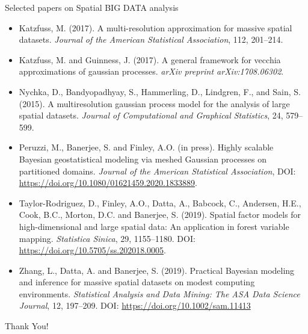 \documentclass[
10pt]{beamer}
\begin{document}
\begin{frame}{Selected papers on Spatial BIG DATA analysis}
{\begin{itemize}
\item Katzfuss, M. (2017). A multi-resolution approximation for massive spatial datasets. \emph{Journal of the American Statistical Association}, 112, 201--214.
 
\item Katzfuss, M. and Guinness, J. (2017). A general framework for vecchia approximations of gaussian processes. \emph{arXiv preprint arXiv:1708.06302}.

\item Nychka, D., Bandyopadhyay, S., Hammerling, D., Lindgren, F., and Sain, S. (2015). A multiresolution gaussian process model for the analysis of large spatial datasets. \emph{Journal of Computational and Graphical Statistics}, 24, 579--599. 
 

\item Peruzzi, M., Banerjee, S. and Finley, A.O. (in press). Highly scalable Bayesian geostatistical modeling via meshed Gaussian processes on partitioned domains. \emph{Journal of the American Statistical Association}, DOI: \url{https://doi.org/10.1080/01621459.2020.1833889}. 
 
\item Taylor-Rodriguez, D., Finley, A.O., Datta, A., Babcock, C., Andersen, H.E., Cook, B.C., Morton, D.C. and Banerjee, S. (2019).  Spatial factor models for high-dimensional and large spatial data: An application in forest variable mapping. \emph{Statistica Sinica}, {29}, 1155--1180. DOI: \url{https://doi.org/10.5705/ss.202018.0005}.
 
 \item Zhang, L., Datta, A. and Banerjee, S. (2019). Practical Bayesian modeling and inference for massive spatial datasets on modest computing environments. \emph{Statistical Analysis and Data Mining: The ASA Data Science Journal}, {12}, 197--209. DOI: \url{https://doi.org/10.1002/sam.11413}
\end{itemize}
}
 
\end{frame}

\begin{frame}
 
 \begin{center}
  {\Huge Thank You!}
 \end{center}

\end{frame}
\end{document}
